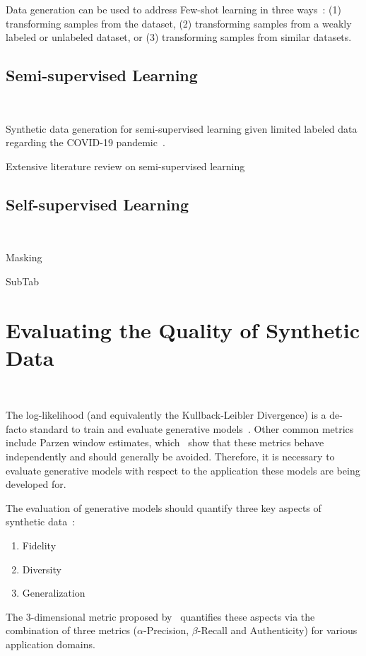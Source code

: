 \documentclass[parskip=full]{scrartcl}
\begin{document}
Data generation can be used to address Few-shot learning in three
ways~\cite{wang2020generalizing}: (1) transforming samples from the dataset,
(2) transforming samples from a weakly labeled or unlabeled dataset, or (3)
transforming samples from similar datasets.

\subsection{Semi-supervised Learning}~\label{sec:semi-supervised-learning}

Synthetic data generation for semi-supervised learning given limited labeled
data regarding the COVID-19 pandemic~\cite{das2022conditional}.

Extensive literature review on semi-supervised learning~\cite{van2020survey}

\subsection{Self-supervised Learning}~\label{sec:self-supervised-learning}

Masking~\cite{yoon2020vime}

SubTab~\cite{ucar2021subtab}

\section{Evaluating the Quality of Synthetic Data
}~\label{sec:evaluating-synthetic-data}

The log-likelihood (and equivalently the Kullback-Leibler Divergence) is a
de-facto standard to train and evaluate generative
models~\cite{theis2016note}. Other common metrics include Parzen window
estimates, which~\citet{theis2016note} show that these metrics behave
independently and should generally be avoided. Therefore, it is necessary
to evaluate generative models with respect to the application these models are
being developed for.


The evaluation of generative models should quantify three key aspects of
synthetic data~\cite{alaa2022faithful}:

\begin{enumerate}
    \item Fidelity
    \item Diversity 
    \item Generalization
\end{enumerate}

The 3-dimensional metric proposed by~\citet{alaa2022faithful} quantifies these
aspects via the combination of three metrics ($\alpha$-Precision,
$\beta$-Recall and Authenticity) for various application domains.
\end{document}

